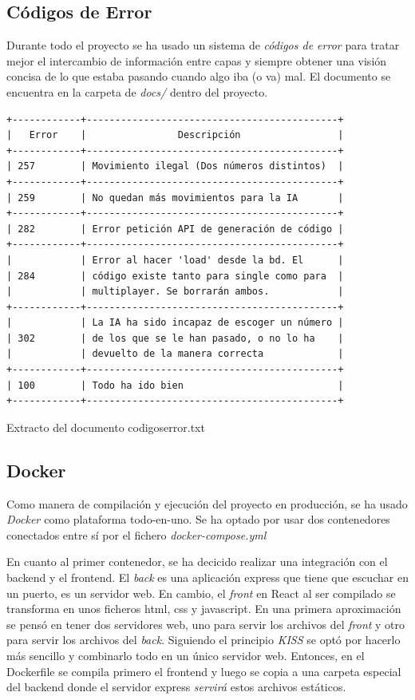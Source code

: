\documentclass[12pt,epsf,titlepage,a4paper]{article}
\begin{document}
\subsection{Códigos de Error}

Durante todo el proyecto se ha usado un sistema de \emph{códigos de error} para tratar mejor el intercambio de información entre capas y siempre obtener una visión concisa de lo que estaba pasando cuando algo iba (o va) mal. El documento se encuentra en la carpeta de \emph{docs/} dentro del proyecto. 

\begin{tcolorbox}
\begin{verbatim}
+------------+--------------------------------------------+
|   Error    |                Descripción                 |
+------------+--------------------------------------------+
| 257        | Movimiento ilegal (Dos números distintos)  |
+------------+--------------------------------------------+
| 259        | No quedan más movimientos para la IA       |
+------------+--------------------------------------------+
| 282        | Error petición API de generación de código |
+------------+--------------------------------------------+
|            | Error al hacer 'load' desde la bd. El      |
| 284        | código existe tanto para single como para  |
|            | multiplayer. Se borrarán ambos.            |
+------------+--------------------------------------------+
|            | La IA ha sido incapaz de escoger un número |
| 302        | de los que se le han pasado, o no lo ha    |
|            | devuelto de la manera correcta             |
+------------+--------------------------------------------+
| 100        | Todo ha ido bien                           |
+------------+--------------------------------------------+
\end{verbatim}
\end{tcolorbox}
\footnotesize{Extracto del documento codigoserror.txt}

\subsection{Docker} \label{dockerpaquete}

Como manera de compilación y ejecución del proyecto en producción, se ha usado \emph{Docker \cite{docker}} como plataforma todo-en-uno. Se ha optado por usar dos contenedores conectados entre sí por el fichero \emph{docker-compose.yml}

En cuanto al primer contenedor, se ha decicido realizar una integración con el backend y el frontend. El \emph{back} es una aplicación express que tiene que escuchar en un puerto, es un servidor web. En cambio, el \emph{front} en React al ser compilado se transforma en unos ficheros html, css y javascript. En una primera aproximación se pensó en tener dos servidores web, uno para servir los archivos del \emph{front} y otro para servir los archivos del \emph{back}. Siguiendo el principio \emph{KISS}\cite{kissp} se optó por hacerlo más sencillo y combinarlo todo en un único servidor web. Entonces, en el Dockerfile se compila primero el frontend y luego se copia a una carpeta especial del backend donde el servidor express \emph{servirá} estos archivos estáticos.
\end{document}
